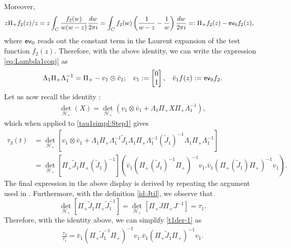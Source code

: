 \documentclass[a4paper,reqno,11pt]{amsart}
\numberwithin{equation}{section}
\numberwithin{figure}{section}
\theoremstyle{plain}
\theoremstyle{remark}
\numberwithin{rhp}{section}
\begin{document}
    Moreover,
    \begin{align}
         z \Pi_{+} f_2(z)/z = z \int_C \frac{f_2(w)}{w (w-z)} \frac{dw}{2\pi i} = \int_C f_2(w)\left(\frac{1}{w-z}-\frac{1}{w}\right)\frac{dw}{2\pi i} 
        &=: \Pi_{+} f_2(z) - {\sf ev}_0 f_2(z),
    \end{align}
where ${\sf ev}_0$ reads out the constant term in the Laurent expansion of the test function $f_2(z)$.
Therefore, with the above identity, we can write the expression \eqref{eq:Lambda1conj} as
    \begin{align}
        \Lambda_1 \Pi_{+} \Lambda_1^{-1} = \Pi_{+} - v_1 \otimes \bar{v}_1; && v_1 := \begin{bmatrix}
             0  \\
             1 
        \end{bmatrix}, && \bar{v}_1 f(z) := {\sf ev}_0 f_2 .
    \end{align}
    Let us now recall the identity \cite[eq (4.15)]{gavrylenko2025riemannhilbertproblemsfredholmdeterminants}:
    \begin{align}
        \det_{\mathcal{H}_{+}} \left( X \right) =  \det_{\mathcal{H}_{+}} \left(v_1 \otimes \bar{v}_1 + \Lambda_1 \Pi_{+} X \Pi_{+} \Lambda_1^{-1}\right),
    \end{align}
    which when applied to \eqref{tau1simpl:Step1} gives
    \begin{align}
        \tau_3(t) & =  \det_{\mathcal{H}_{+}} \left[v_1 \otimes \bar{v}_1 + \Lambda_1\Pi_{+} \Lambda_1^{-1} \widetilde{J}_1 \Lambda_1\Pi_{+} \Lambda_1^{-1} (\widetilde{J}_1)^{-1} \Lambda_1 \Pi_{+} \Lambda_1^{-1}\right]\\
        &= \det_{\mathcal{H}_{+}} \left[\Pi_{+} \widetilde{J}_1 \Pi_{+} (\widetilde{J}_1)^{-1} \right] \left(\bar{v}_1 \left(\Pi_{+} (\widetilde{J}_1)^{-1} \Pi_{+} \right)^{-1} v_1 . \bar{v}_1 \left(\Pi_{+} (\widetilde{J}_1) \Pi_{+} \right)^{-1} v_1 \right). \label{t1der-1}
    \end{align}
   The final expression in the above display is derived by repeating the argument used in \cite[(4.17)-(4.19)]{gavrylenko2025riemannhilbertproblemsfredholmdeterminants}.
Furthermore, with the definition \eqref{id:Jtil}, we observe that $$\det_{\mathcal{H}_{+}} \left[\Pi_{+} \widetilde{J}_1 \Pi_{+} \widetilde{J}_1^{-1} \right] = \det_{\mathcal{H}_{+}} \left[\Pi_{+} J \Pi_{+} {J}^{-1} \right]= \tau_1.$$ Therefore, with the identity above, we can simplify \eqref{t1der-1} as
\begin{align}
    \frac{\tau_3}{\tau_1} = \bar{v}_1 \left(\Pi_{+} \widetilde{J}_1^{-1} \Pi_{+} \right)^{-1} v_1 . \bar{v}_1 \left(\Pi_{+} \widetilde{J}_1 \Pi_{+} \right)^{-1} v_1.\label{tau1comp:frac}
\end{align}
\end{document}
